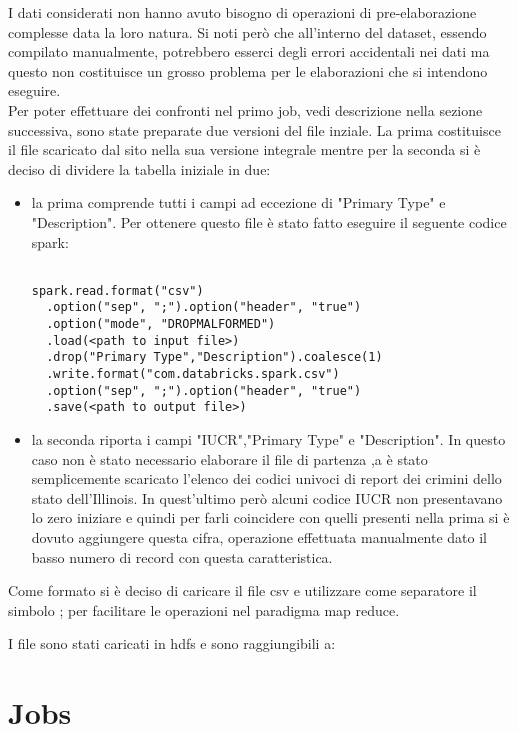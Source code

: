 \documentclass[10pt]{article}
\begin{document}
I dati considerati non hanno avuto bisogno di operazioni di pre-elaborazione complesse data la loro natura. Si noti però che all'interno del dataset, essendo compilato manualmente, potrebbero esserci degli errori accidentali nei dati ma questo non costituisce un grosso problema per le elaborazioni che si intendono eseguire. \\

Per poter effettuare dei confronti nel primo job, vedi descrizione nella sezione successiva, sono state preparate due versioni del file inziale.
La prima costituisce il file scaricato dal sito nella sua versione integrale mentre per la seconda si è deciso di dividere la tabella iniziale in due:
\begin{itemize}
\item la prima comprende tutti i campi ad eccezione di "Primary Type" e "Description". Per ottenere questo file è stato fatto eseguire il seguente codice spark:
\begin{lstlisting}

spark.read.format("csv")
  .option("sep", ";").option("header", "true")
  .option("mode", "DROPMALFORMED")
  .load(<path to input file>)
  .drop("Primary Type","Description").coalesce(1)
  .write.format("com.databricks.spark.csv")
  .option("sep", ";").option("header", "true")
  .save(<path to output file>)

\end{lstlisting}

\item la seconda riporta i campi "IUCR","Primary Type" e "Description". In questo caso non è stato necessario elaborare il file di partenza ,a è stato semplicemente scaricato l'elenco dei codici univoci di report dei crimini dello stato dell'Illinois. In quest'ultimo però alcuni codice IUCR non presentavano lo zero iniziare e quindi per farli coincidere con quelli presenti nella prima si è dovuto aggiungere questa cifra, operazione effettuata manualmente dato il basso numero di record con questa caratteristica. 
\end{itemize}

Come formato si è deciso di caricare il file csv e utilizzare come separatore il simbolo ; per facilitare le operazioni nel paradigma map reduce.

I file sono stati caricati in hdfs e sono raggiungibili a:



\section{Jobs}
\end{document}
